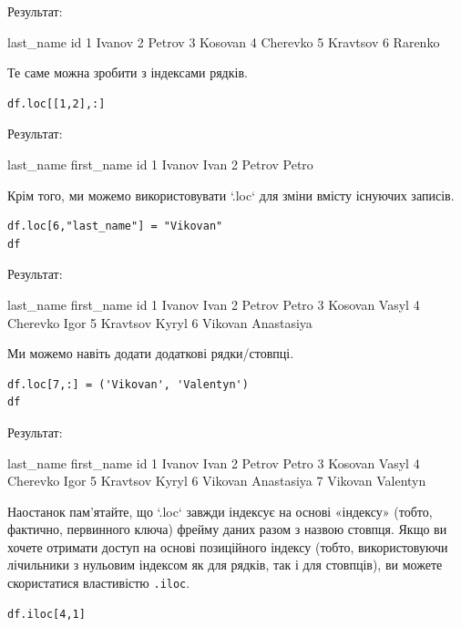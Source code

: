 Результат:

\begin{console}
    last_name
id	
1	Ivanov
2	Petrov
3	Kosovan
4	Cherevko
5	Kravtsov
6	Rarenko
\end{console}

Те саме можна зробити з індексами рядків.

\begin{lstlisting}
df.loc[[1,2],:]
\end{lstlisting}

Результат:

\begin{console}
	last_name	first_name
id		
1	Ivanov	Ivan
2	Petrov	Petro
\end{console}



Крім того, ми можемо використовувати `.loc` для зміни вмісту існуючих записів.

\begin{lstlisting}
df.loc[6,"last_name"] = "Vikovan"
df
\end{lstlisting}

Результат:

\begin{console}
	last_name	first_name
id		
1	Ivanov	Ivan
2	Petrov	Petro
3	Kosovan	Vasyl
4	Cherevko	Igor
5	Kravtsov	Kyryl
6	Vikovan	Anastasiya
\end{console}




Ми можемо навіть додати додаткові рядки/стовпці.

\begin{lstlisting}
df.loc[7,:] = ('Vikovan', 'Valentyn')
df
\end{lstlisting}

Результат:

\begin{console}
last_name	first_name
id		
1	Ivanov	Ivan
2	Petrov	Petro
3	Kosovan	Vasyl
4	Cherevko	Igor
5	Kravtsov	Kyryl
6	Vikovan	Anastasiya
7	Vikovan	Valentyn
\end{console}


 Наостанок пам’ятайте, що `.loc` завжди індексує на основі «індексу» (тобто, 
фактично, первинного ключа) фрейму даних 
разом з назвою стовпця. Якщо ви хочете отримати доступ на основі позиційного 
індексу (тобто, використовуючи лічильники з нульовим індексом 
як для рядків, так і для стовпців), ви можете скористатися властивістю \verb|.iloc|.

\begin{lstlisting}
df.iloc[4,1]
\end{lstlisting}

